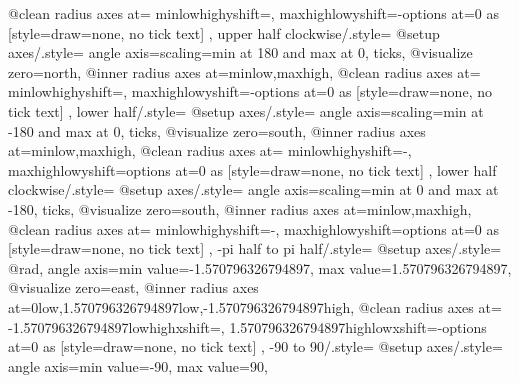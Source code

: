 {{{      @clean radius axes at={%
        {min}{low}{high}{yshift=}{},%
        {max}{high}{low}{yshift=-}{options at=0 as
          [{style={draw=none}, no tick text}]}
      }
    }
  },
  upper half clockwise/.style={
    @setup axes/.style={
      angle axis={scaling=min at 180 and max at 0, ticks},
      @visualize zero=north,
      @inner radius axes at={{min}{low},{max}{high}},
      @clean radius axes at={%
        {min}{low}{high}{yshift=}{},%
        {max}{high}{low}{yshift=-}{options at=0 as
          [{style={draw=none}, no tick text}]}
      }
    }
  },
  lower half/.style={
    @setup axes/.style={
      angle axis={scaling=min at -180 and max at 0, ticks},
      @visualize zero=south,
      @inner radius axes at={{min}{low},{max}{high}},
      @clean radius axes at={%
        {min}{low}{high}{yshift=-}{},%
        {max}{high}{low}{yshift=}{options at=0 as
          [{style={draw=none}, no tick text}]}
      }
    }
  },
  lower half clockwise/.style={
    @setup axes/.style={
      angle axis={scaling=min at 0 and max at -180, ticks},
      @visualize zero=south,
      @inner radius axes at={{min}{low},{max}{high}},
      @clean radius axes at={%
        {min}{low}{high}{yshift=-}{},%
        {max}{high}{low}{yshift=}{options at=0 as
          [{style={draw=none}, no tick text}]}
      }
    }
  },
  -pi half to pi half/.style={
    @setup axes/.style={
      @rad,
      angle axis={min value=-1.570796326794897, max value=1.570796326794897},
      @visualize zero=east,
      @inner radius axes at={{0}{low},{1.570796326794897}{low},{-1.570796326794897}{high}},
      @clean radius axes at={%
        {-1.570796326794897}{low}{high}{xshift=}{},%
        {1.570796326794897}{high}{low}{xshift=-}{options at=0 as
          [{style={draw=none}, no tick text}]}
      }
    }
  },
  -90 to 90/.style={
    @setup axes/.style={
      angle axis={min value=-90, max value=90},
}}}
